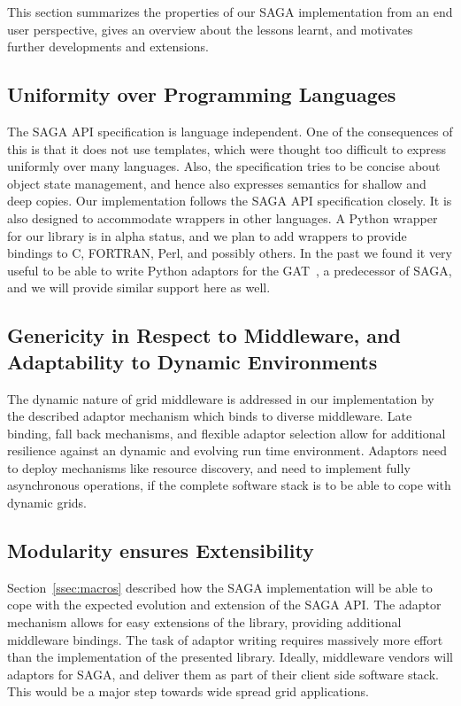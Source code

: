 
This section 
summarizes the properties of our SAGA implementation from an
end user perspective, gives an overview about the lessons learnt, and 
motivates further developments and extensions.


\subsection{Uniformity over Programming Languages}
\label{ssec:lang}

 The SAGA API specification is language independent. 
 One of the consequences of this is that it does not use templates,  which were thought too
 difficult to express uniformly over many languages.  Also, the
 specification tries to be concise about object state management, and
 hence also expresses semantics for shallow and deep copies.
 Our implementation follows the SAGA API specification closely. It is also
 designed to accommodate wrappers in other languages.
 A Python wrapper for our library is in
 alpha status, and we plan to add wrappers to provide
 bindings to C, FORTRAN, Perl, and possibly others. In the past we found it
 very useful to be able to write Python adaptors for the 
 GAT~\cite{gat}, a predecessor of SAGA,
 and we will provide similar support here as well.

\subsection{Genericity in Respect to Middleware, and
            Adaptability to Dynamic Environments}

 The dynamic nature of grid middleware 
 is addressed in our implementation 
 by the described adaptor mechanism which binds to diverse middleware.  
 Late binding, fall back mechanisms, and
 flexible adaptor selection allow for additional resilience against
 an dynamic and evolving run time environment.  
 Adaptors need to deploy mechanisms like resource
 discovery, and need to implement fully asynchronous operations, if
 the complete software stack is to be able to cope with dynamic grids.


\subsection{Modularity ensures Extensibility}

 Section~\ref{ssec:macros} described how  the SAGA
 implementation will be able to cope with the expected evolution and
 extension of the SAGA API.  The adaptor mechanism
 allows for easy extensions of the library, providing additional
 middleware bindings.  
 The task of adaptor writing
 requires massively more effort than the implementation of the
 presented library.
 Ideally, middleware vendors will 
  adaptors for SAGA, and deliver them
 as part of their client side software stack.
 This would be a major step towards wide spread grid applications.


